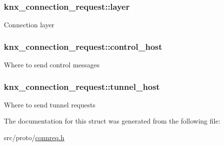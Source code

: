\subsubsection[{\texorpdfstring{layer}{layer}}]{ knx\+\_\+connection\+\_\+request\+::layer}\hypertarget{structknx__connection__request_a9befd4f8f8ba20eb5aaf60cb30c4d2c4}{}\label{structknx__connection__request_a9befd4f8f8ba20eb5aaf60cb30c4d2c4}
Connection layer 
\subsubsection[{\texorpdfstring{control\+\_\+host}{control_host}}]{ knx\+\_\+connection\+\_\+request\+::control\+\_\+host}\hypertarget{structknx__connection__request_a47d011996e039bb86e9b298b30df9c89}{}\label{structknx__connection__request_a47d011996e039bb86e9b298b30df9c89}
Where to send control messages 
\subsubsection[{\texorpdfstring{tunnel\+\_\+host}{tunnel_host}}]{ knx\+\_\+connection\+\_\+request\+::tunnel\+\_\+host}\hypertarget{structknx__connection__request_a230af058a23d1dbce20c689687c3033d}{}\label{structknx__connection__request_a230af058a23d1dbce20c689687c3033d}
Where to send tunnel requests 

The documentation for this struct was generated from the following file\+:\begin{DoxyCompactItemize}
\item 
src/proto/\hyperlink{connreq_8h}{connreq.\+h}\end{DoxyCompactItemize}
